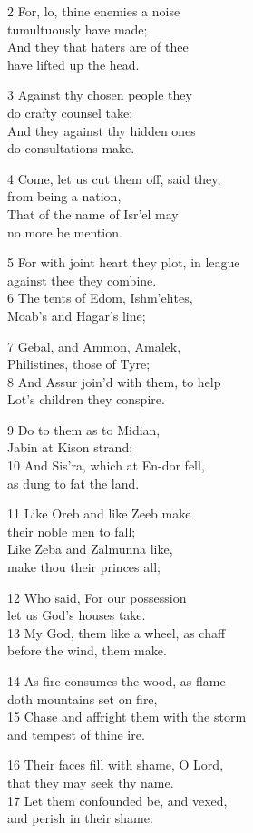 2 For, lo, thine enemies a noise\\
tumultuously have made;\\
And they that haters are of thee\\
have lifted up the head.

3 Against thy chosen people they\\
do crafty counsel take;\\
And they against thy hidden ones\\
do consultations make.

4 Come, let us cut them off, said they,\\
from being a nation,\\
That of the name of Isr’el may\\
no more be mention.

5 For with joint heart they plot, in league\\
against thee they combine.\\
6 The tents of Edom, Ishm’elites,\\
Moab’s and Hagar’s line;

7 Gebal, and Ammon, Amalek,\\
Philistines, those of Tyre;\\
8 And Assur join’d with them, to help\\
Lot’s children they conspire.

9 Do to them as to Midian,\\
Jabin at Kison strand;\\
10 And Sis’ra, which at En-dor fell,\\
as dung to fat the land.

11 Like Oreb and like Zeeb make\\
their noble men to fall;\\
Like Zeba and Zalmunna like,\\
make thou their princes all;

12 Who said, For our possession\\
let us God’s houses take.\\
13 My God, them like a wheel, as chaff\\
before the wind, them make.

14 As fire consumes the wood, as flame\\
doth mountains set on fire,\\
15 Chase and affright them with the storm\\
and tempest of thine ire.

16 Their faces fill with shame, O Lord,\\
that they may seek thy name.\\
17 Let them confounded be, and vexed,\\
and perish in their shame:

